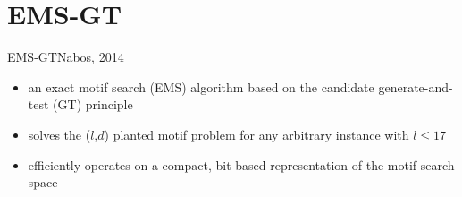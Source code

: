 \documentclass[pdf,xcolor={dvipsnames}]{beamer}
\begin{document}
\section{EMS-GT}
	\begin{frame}{EMS-GT}{Nabos, 2014}
		\begin{itemize}
		\item an exact motif search (EMS) algorithm based on the candidate generate-and-test (GT) principle\newline
		\item solves the ($l$,$d$) planted motif problem for any arbitrary instance with $l \leq 17$ \newline
		\item efficiently operates on a compact, bit-based representation of the motif search space
		\end{itemize}
		\end{frame}
\end{document}
